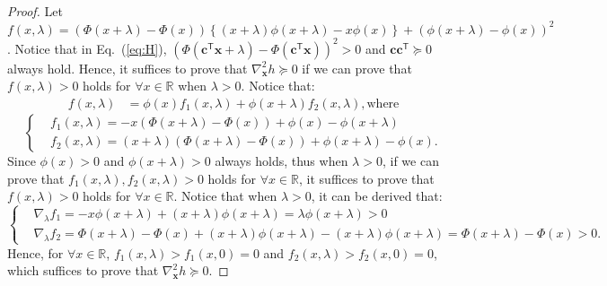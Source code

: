 \documentclass{article}
\theoremstyle{plain}
\theoremstyle{definition}
\def \x {\mathbf{x}}
\def \Eq {Eq.}
\def \x {\mathbf{x}}
\def \c {\mathbf{c}}
\begin{document}
\begin{proof}
  Let $f(x, \lambda) = \left(\Phi\left(x + \lambda\right) - \Phi\left(x \right)\right)\left\{\left(x + \lambda\right)\phi\left(x + \lambda\right) - x\phi\left(x \right)\right\} + \left(\phi\left(x + \lambda\right) - \phi\left(x \right)\right)^2$. Notice that in \Eq~(\ref{eq:H}), $\left(\Phi\left(\c^\mathsf{T} \x + \lambda\right) - \Phi\left(\c^\mathsf{T} \x \right)\right)^2>0$ and $\c\c^\mathsf{T}\succeq 0$ always hold. Hence, it suffices to prove that $\nabla^2_\x h\succeq 0$ if we can prove that $f(x, \lambda) > 0$ holds for $\forall x\in\mathbb{R}$ when $\lambda>0$.
  Notice that:
  \begin{equation*}
    \label{eq:trick}
    \begin{aligned}
      f(x, \lambda) &= \phi(x)f_1(x, \lambda) + \phi(x+\lambda)f_2(x, \lambda), \text{where}
    \end{aligned}
  \end{equation*}
  \begin{equation*}
    \left\{
    \begin{aligned}
      &f_1(x, \lambda) =   -x\left(\Phi\left(x + \lambda\right) - \Phi\left(x \right)\right) + \phi(x)-\phi(x+\lambda)\\
      &f_2(x, \lambda) =  (x+\lambda)\left(\Phi\left(x + \lambda\right) - \Phi\left(x \right)\right) + \phi(x+\lambda)-\phi(x).
    \end{aligned}
    \right.
  \end{equation*}
Since $\phi(x)>0$ and $\phi(x+\lambda)>0$ always holds, thus when $\lambda>0$, if we can prove that $f_1(x, \lambda), f_2(x, \lambda) > 0$ holds for $\forall x\in\mathbb{R}$, it suffices to prove that $f(x, \lambda) > 0$ holds for $\forall x\in\mathbb{R}$.
Notice that when $\lambda>0$, it can be derived that:
\begin{equation*}
  \left\{
  \begin{aligned}
    &\nabla_\lambda f_1  =   -x\phi\left(x + \lambda\right) + (x+\lambda)\phi(x+\lambda) = \lambda \phi(x+\lambda) > 0\\
    &\nabla_\lambda f_2  = \Phi\left(x + \lambda\right) - \Phi\left(x \right) + (x+\lambda)\phi\left(x + \lambda\right) - (x+\lambda)\phi(x+\lambda)=\Phi\left(x + \lambda\right) - \Phi\left(x \right)>0.
  \end{aligned}
  \right.
\end{equation*}
Hence, for $\forall x\in\mathbb{R}$, $f_1(x, \lambda)>f_1(x, 0) = 0$ and $f_2(x, \lambda)>f_2(x, 0) = 0$, which suffices to prove that $\nabla^2_\x h\succeq 0$.
\end{proof}
\end{document}
